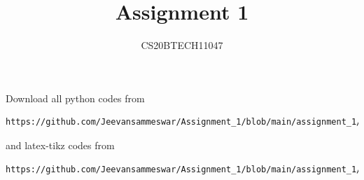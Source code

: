 \documentclass[journal,12pt,twocolumn]{IEEEtran}
\DeclareMathOperator*{\Res}{Res}
\begin{document}
\newcommand{\BEQA}{\begin{eqnarray}}
\newcommand{\EEQA}{\end{eqnarray}}
\newcommand{\define}{\stackrel{\triangle}{=}}

\raggedbottom
\setlength{\parindent}{0pt}
\providecommand{\mbf}{\mathbf}
\providecommand{\pr}[1]{\ensuremath{\Pr\left(#1\right)}}
\providecommand{\qfunc}[1]{\ensuremath{Q\left(#1\right)}}
\providecommand{\sbrak}[1]{\ensuremath{{}\left[#1\right]}}
\providecommand{\lsbrak}[1]{\ensuremath{{}\left[#1\right.}}
\providecommand{\rsbrak}[1]{\ensuremath{{}\left.#1\right]}}
\providecommand{\brak}[1]{\ensuremath{\left(#1\right)}}
\providecommand{\lbrak}[1]{\ensuremath{\left(#1\right.}}
\providecommand{\rbrak}[1]{\ensuremath{\left.#1\right)}}
\providecommand{\cbrak}[1]{\ensuremath{\left\{#1\right\}}}
\providecommand{\lcbrak}[1]{\ensuremath{\left\{#1\right.}}
\providecommand{\rcbrak}[1]{\ensuremath{\left.#1\right\}}}
\theoremstyle{remark}
\newtheorem{rem}{Remark}
\newcommand{\sgn}{\mathop{\mathrm{sgn}}}
\providecommand{\abs}[1]{\vert#1\vert}
\providecommand{\res}[1]{\Res\displaylimits_{#1}} 
\providecommand{\norm}[1]{\lVert#1\rVert}
\providecommand{\mtx}[1]{\mathbf{#1}}
\providecommand{\mean}[1]{E[ #1 ]}
\providecommand{\fourier}{\overset{\mathcal{F}}{ \rightleftharpoons}}
\providecommand{\system}{\overset{\mathcal{H}}{ \longleftrightarrow}}
\newcommand{\solution}{\noindent \textbf{Solution: }}
\newcommand{\cosec}{\,\text{cosec}\,}
\providecommand{\dec}[2]{\ensuremath{\overset{#1}{\underset{#2}{\gtrless}}}}
\newcommand{\myvec}[1]{\ensuremath{\begin{pmatrix}#1\end{pmatrix}}}
\newcommand{\mydet}[1]{\ensuremath{\begin{vmatrix}#1\end{vmatrix}}}
\makeatletter
{}
\makeatother
\let\StandardTheFigure\thefigure
\let\vec\mathbf
\renewcommand{\thefigure}{\theproblem}
\def\putbox#1#2#3{\makebox[0in][l]{\makebox[#1][l]{}\raisebox{\baselineskip}[0in][0in]{\raisebox{#2}[0in][0in]{#3}}}}
     \def\rightbox#1{\makebox[0in][r]{#1}}
     \def\centbox#1{\makebox[0in]{#1}}
     \def\topbox#1{\raisebox{-\baselineskip}[0in][0in]{#1}}
     \def\midbox#1{\raisebox{-0.5\baselineskip}[0in][0in]{#1}}
\vspace{3cm}
\title{Assignment 1}
\author{CS20BTECH11047}
\maketitle
\newpage
\bigskip
\renewcommand{\thefigure}{\theenumi}
\renewcommand{\thetable}{\theenumi}
Download all python codes from 
\begin{lstlisting}
https://github.com/Jeevansammeswar/Assignment_1/blob/main/assignment_1/codes/assignment_1.py
\end{lstlisting}
%
and latex-tikz codes from 
%
\begin{lstlisting}
https://github.com/Jeevansammeswar/Assignment_1/blob/main/assignment_1/assignment_1.tex
\end{lstlisting}
\end{document}
